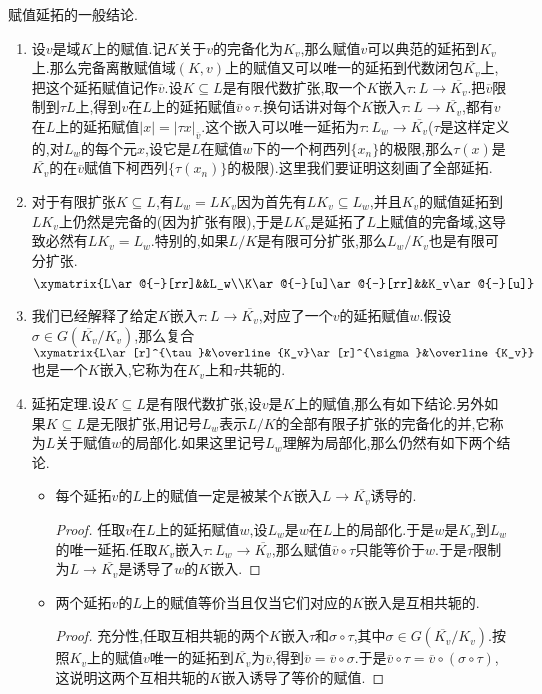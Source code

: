 赋值延拓的一般结论.
\begin{enumerate}
	\item 设$v$是域$K$上的赋值.记$K$关于$v$的完备化为$K_v$,那么赋值$v$可以典范的延拓到$K_v$上.那么完备离散赋值域$(K,v)$上的赋值又可以唯一的延拓到代数闭包$\overline{K_v}$上,把这个延拓赋值记作$\overline{v}$.设$K\subseteq L$是有限代数扩张,取一个$K$嵌入$\tau:L\to\overline{K_v}$.把$\overline{v}$限制到$\tau L$上,得到$v$在$L$上的延拓赋值$\overline{v}\circ\tau$.换句话讲对每个$K$嵌入$\tau:L\to\overline{K_v}$,都有$v$在$L$上的延拓赋值$|x|=|\tau x|_{\overline{v}}$.这个嵌入可以唯一延拓为$\tau:L_w\to\overline{K_v}$($\tau$是这样定义的,对$L_w$的每个元$x$,设它是$L$在赋值$w$下的一个柯西列$\{x_n\}$的极限,那么$\tau(x)$是$\overline{K_v}$的在$\overline{v}$赋值下柯西列$\{\tau(x_n)\}$的极限).这里我们要证明这刻画了全部延拓.
	\item 对于有限扩张$K\subseteq L$,有$L_w=LK_v$因为首先有$LK_v\subseteq L_w$,并且$K_v$的赋值延拓到$LK_v$上仍然是完备的(因为扩张有限),于是$LK_v$是延拓了$L$上赋值的完备域,这导致必然有$LK_v=L_w$.特别的,如果$L/K$是有限可分扩张,那么$L_w/K_v$也是有限可分扩张.
	$$\xymatrix{L\ar@{-}[rr]&&L_w\\K\ar@{-}[u]\ar@{-}[rr]&&K_v\ar@{-}[u]}$$
	\item 我们已经解释了给定$K$嵌入$\tau:L\to\overline{K_v}$,对应了一个$v$的延拓赋值$w$.假设$\sigma\in G(\overline{K_v}/K_v)$,那么复合$\xymatrix{L\ar[r]^{\tau}&\overline{K_v}\ar[r]^{\sigma}&\overline{K_v}}$也是一个$K$嵌入,它称为在$K_v$上和$\tau$共轭的.
	\item 延拓定理.设$K\subseteq L$是有限代数扩张,设$v$是$K$上的赋值,那么有如下结论.另外如果$K\subseteq L$是无限扩张,用记号$L_w$表示$L/K$的全部有限子扩张的完备化的并,它称为$L$关于赋值$w$的局部化.如果这里记号$L_w$理解为局部化,那么仍然有如下两个结论.
	\begin{itemize}
		\item 每个延拓$v$的$L$上的赋值一定是被某个$K$嵌入$L\to\overline{K_v}$诱导的.
		\begin{proof}
			
			任取$v$在$L$上的延拓赋值$w$,设$L_w$是$w$在$L$上的局部化.于是$w$是$K_v$到$L_w$的唯一延拓.任取$K_v$嵌入$\tau:L_w\to\overline{K_v}$,那么赋值$\overline{v}\circ\tau$只能等价于$w$.于是$\tau$限制为$L\to\overline{K_v}$是诱导了$w$的$K$嵌入.
		\end{proof}
		\item 两个延拓$v$的$L$上的赋值等价当且仅当它们对应的$K$嵌入是互相共轭的.
		\begin{proof}
			
			充分性,任取互相共轭的两个$K$嵌入$\tau$和$\sigma\circ\tau$,其中$\sigma\in G(\overline{K_v}/K_v)$.按照$K_v$上的赋值$v$唯一的延拓到$\overline{K_v}$为$\overline{v}$,得到$\overline{v}=\overline{v}\circ\sigma$.于是$\overline{v}\circ\tau=\overline{v}\circ(\sigma\circ\tau)$,这说明这两个互相共轭的$K$嵌入诱导了等价的赋值.
			

\end{proof}
\end{itemize}
\end{enumerate}
